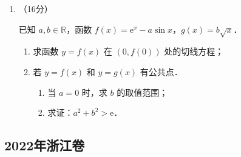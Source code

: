 \begin{description}
\begin{enumerate}[leftmargin=5pt]
        已知椭圆 $\dfrac{x^2}{a^2}+\dfrac{y^2}{b^2}=1\,(a>b>0)$ 的右焦点为 $F$，上顶点为 $B$，离心率为 $\dfrac{2\sqrt{5}}{5}$，且 $|BF|=\sqrt{5}$．

        \begin{enumerate}[label=(\arabic*)]
            \item 求椭圆的方程；
            \item 直线 $l$ 与椭圆有唯一的公共点 $M$，与 $y$ 轴的正半轴交于点 $N$，过 $N$ 与 $BF$ 垂直的直线交 $x$ 轴于点 $P$．若 $MP\parallel BF$，求直线 $l$ 的方程．
        \end{enumerate}

        \item （16分）

        已知 $a,b\in\mathbb{R}$，函数 $f(x)=\mathrm{e}^x-a\sin x$，$g(x)=b\sqrt{x}$．

        \begin{enumerate}[label=(\arabic*)]
            \item 求函数 $y=f(x)$ 在 $(0,f(0))$ 处的切线方程；
            \item 若 $y=f(x)$ 和 $y=g(x)$ 有公共点．
            \begin{enumerate}[label=(\roman*)]
                \item 当 $a=0$ 时，求 $b$ 的取值范围；
                \item 求证：$a^2+b^2>\mathrm{e}$．
            \end{enumerate}
        \end{enumerate}
    \end{enumerate}
\end{description}
\clearpage


\subsection{2022年浙江卷}\label{gk:2022年浙江卷}

